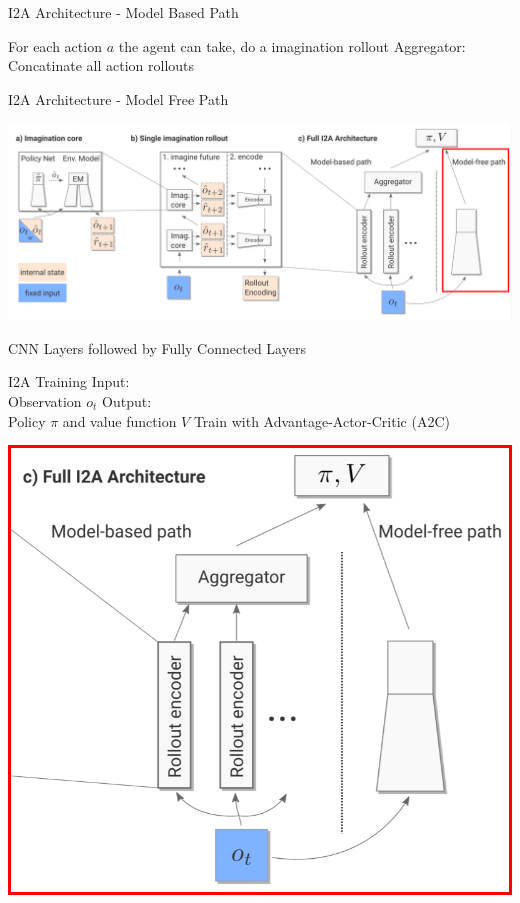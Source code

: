  
I2A Architecture - Model Based Path 
 
 
       For each action $a$ the agent can take, do a imagination rollout  
     Aggregator: \\ 
    Concatinate all action rollouts 
   
 
 
 
I2A Architecture - Model Free Path 
 
 
\includegraphics[width=\columnwidth]{./Images/i2a_all_model_free_path.png}%
 
CNN Layers followed by Fully Connected Layers 
 
 
 
I2A Training 
Input:\\ 
    Observation $o_t$ 
     Output:\\ 
    Policy $\pi$ and value function $V$ 
     Train with Advantage-Actor-Critic (A2C) 
   
  \begin{center} 
    \includegraphics[width=\columnwidth]{./Images/i2a_a2c.png}%
  \end{center} 
